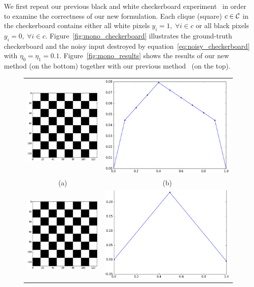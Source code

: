 We first repeat our previous black and white checkerboard
experiment~\cite{Gould:ICML2011,gouldlearning} in order to
examine the correctness of our new formulation. Each clique
(square) $c\in {\mathcal{C}}$ in the checkerboard contains either all white
pixels $y_i=1 ,\;\forall i \in c$ or all black pixels $y_i=0
,\;\forall i \in c$. Figure~\ref{fig:mono_checkerboard}
illustrates the ground-truth checkerboard and the noisy input
destroyed by equation~\eqref{eq:noisy_checkerboard} with
$\eta_0=\eta_1=0.1$. Figure~\ref{fig:mono_results} shows the
results of our new method (on the bottom) together with our
previous method~\cite{gouldlearning} (on the top).

\begin{figure}[ht]
  \centering
  \setlength{\tabcolsep}{2pt}
  \begin{tabular}{cc}
    \includegraphics[width=0.3\columnwidth]{Part2/figures/mono_gt.png}&
                                                                              \includegraphics[width=0.4\columnwidth]{Part2/figures/mono_old.png}\\
    {\small (a)} & {\small (b)} \\
    \includegraphics[width=0.3\columnwidth]{Part2/figures/mono_gt.png}&
                                                                              \includegraphics[width=0.4\columnwidth]{Part2/figures/mono_new.png}\\

\end{tabular}
\end{figure}
